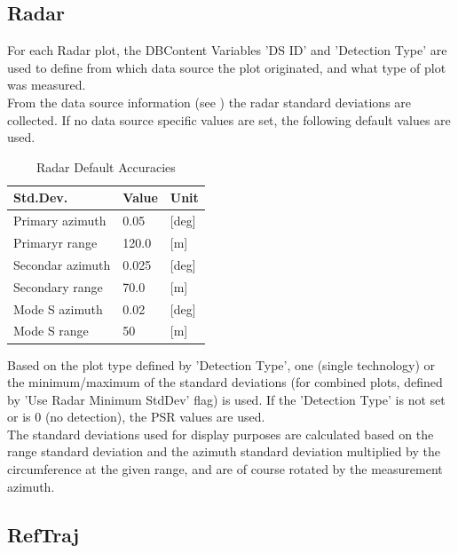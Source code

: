 \subsection{Radar}

For each Radar plot, the DBContent Variables 'DS ID' and 'Detection Type' are used to define from which data source the plot originated, and what type of plot was measured. \\

From the data source information (see ) the radar standard deviations are collected. If no data source specific values are set, the following default values are used. \\

\begin{center}
 \begin{table}[H]
  \begin{tabularx}{\textwidth}{ | X | l | l | }
    \hline
    \textbf{Std.Dev.} & \textbf{Value} & \textbf{Unit} \\ \hline
     Primary azimuth & 0.05 & [deg]\\ \hline
     Primaryr range & 120.0  & [m] \\ \hline
     Secondar azimuth & 0.025 & [deg] \\ \hline
     Secondary range & 70.0 & [m] \\ \hline
     Mode S azimuth & 0.02  & [deg] \\ \hline
     Mode S range & 50 & [m] \\ \hline
\end{tabularx}
  \caption{Radar Default Accuracies}
\end{table}
\end{center}

Based on the plot type defined by 'Detection Type', one (single technology) or the minimum/maximum of the standard deviations (for combined plots, defined by 'Use Radar Minimum StdDev' flag) is used. If the 'Detection Type' is not set or is 0 (no detection), the PSR values are used. \\ 

The standard deviations used for display purposes are calculated based on the range standard deviation and the azimuth standard deviation multiplied by the circumference at the given range, and are of course rotated by the measurement azimuth.

\subsection{RefTraj}

